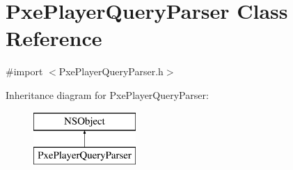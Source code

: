 \hypertarget{interface_pxe_player_query_parser}{\section{Pxe\-Player\-Query\-Parser Class Reference}
\label{interface_pxe_player_query_parser}
}


{\ttfamily \#import $<$Pxe\-Player\-Query\-Parser.\-h$>$}

Inheritance diagram for Pxe\-Player\-Query\-Parser\-:\begin{figure}[H]
\begin{center}
\leavevmode
\includegraphics[height=2.000000cm]{interface_pxe_player_query_parser}
\end{center}
\end{figure}
